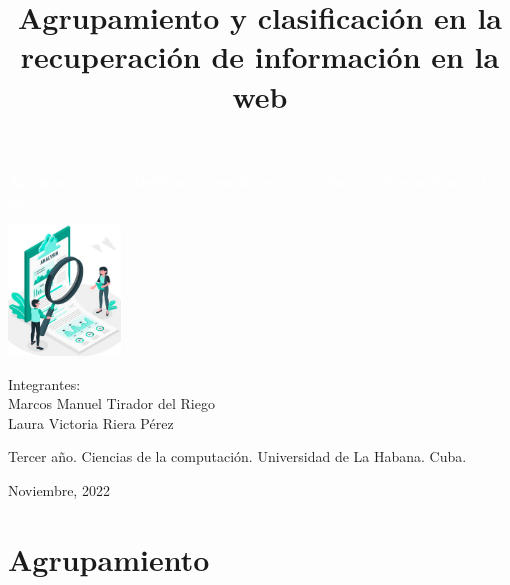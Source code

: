 \documentclass[t,compress,10pt,xcolor=dvipsnames]{beamer}
\title{\textbf{Agrupamiento y clasificaci\'on en la recuperaci\'on de informaci\'on en la web}}
\date{}
\begin{document}
	
	\begin{frame}
		\begin{center}
			\begin{block}{}
				\centering
				\Large\textcolor{white}{\textbf{Agrupamiento y clasificaci\'on en la recuperaci\'on de informaci\'on en la web}}
			\end{block}
		
		\vspace{0.5em}
		\includegraphics[width=3cm]{clustering.jpg}
		
		\vspace{0.5em}
		\footnotesize
		Integrantes:\\
			Marcos Manuel Tirador del Riego\\ 
			Laura Victoria Riera P\'erez
		
		\vspace{0.7em}
		\tiny	
		Tercer año. Ciencias de la computaci\'on. Universidad de La Habana. Cuba.
		
		\vspace{0.7em}
		\scriptsize
		Noviembre, 2022
		\end{center}
	\end{frame}


	\section{Agrupamiento}
\end{document}
